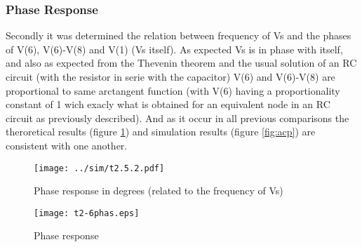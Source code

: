 
\subsubsection{Phase Response}

Secondly it was determined the relation between frequency of Vs and the phases of V(6), V(6)-V(8) and V(1) (Vs itself). As expected Vs is in phase with itself, and also as expected from the Thevenin theorem  and the usual solution of an RC circuit (with the resistor in serie with the capacitor) V(6) and V(6)-V(8) are proportional to same arctangent function (with V(6) having a proportionality constant of 1 wich exacly what is obtained for an equivalent node in an RC circuit as previously described). And as it occur in all previous comparisons the theroretical results (figure \ref{fig:comphas}) and simulation results (figure \ref{fig:acp}) are consistent with one another.

\begin{figure}[h] \centering
  \begin{minipage}{.5\textwidth}
    \texttt{[image: ../sim/t2.5.2.pdf]}
    \caption{Phase response in degrees (related to the frequency of Vs)}
    \label{fig:acp}
    \end{minipage}%
  \begin{minipage}{.5\textwidth}
    \vspace{10mm}
  \centering
    \texttt{[image: t2-6phas.eps]}
    \caption{Phase response}
    \label{fig:comphas}
      \end{minipage}%
\end{figure}








